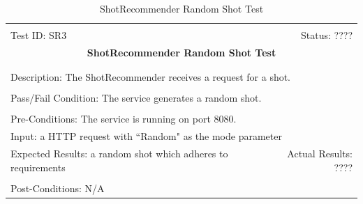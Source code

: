 \documentclass[11pt]{article}
\begin{document}
\begin{center}
\begin{table}[H]
\begin{tabular}{|l r|}\hline&\\[-2mm]
	Test ID: SR3	&Status: ????\\[-3mm]
	\multicolumn{2}{|c|}{\textbf{\large{ShotRecommender Random Shot Test}}}\\&\\\hline&\\[-3mm]
	\multicolumn{2}{|p{\textwidth}|}{Description: The ShotRecommender receives a request for a shot.}\\[1mm]\hline&\\[-3mm]
	\multicolumn{2}{|p{\textwidth}|}{Pass/Fail Condition: The service generates a random shot.}\\[1mm]\hline&\\[-3mm]
	\multicolumn{2}{|p{\textwidth}|}{Pre-Conditions: The service is running on port 8080.}\\[4mm]
	\multicolumn{2}{|p{\textwidth}|}{Input: a HTTP request with ``Random" as the mode parameter}\\[2mm]\hline
	\multicolumn{1}{|p{0.49\textwidth}}{Expected Results: a random shot which adheres to requirements}	&\multicolumn{1}{|p{0.45\textwidth}|}{Actual Results: ????}\\\hline&\\[-3mm]
	\multicolumn{2}{|p{\textwidth}|}{Post-Conditions: N/A}\\\hline
\end{tabular}
\caption{ShotRecommender Random Shot Test}
\end{table}
\end{center}
\end{document}
